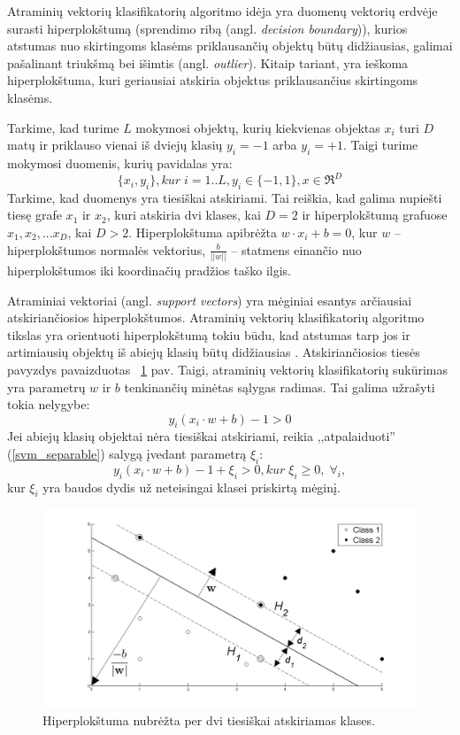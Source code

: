 Atraminių vektorių klasifikatorių algoritmo idėja yra duomenų vektorių erdvėje surasti hiperplokštumą (sprendimo ribą (angl. \textit{decision boundary})), kurios atstumas nuo skirtingoms klasėms priklausančių objektų būtų didžiausias, galimai pašalinant triukšmą bei išimtis (angl. \textit{outlier}). Kitaip tariant, yra ieškoma hiperplokštuma, kuri geriausiai atskiria objektus priklausančius skirtingoms klasėms. 

Tarkime, kad turime $L$ mokymosi objektų, kurių kiekvienas objektas $x_i$ turi $D$ matų ir priklauso vienai iš dviejų klasių $y_i=-1$ arba $y_i=+1$. Taigi turime mokymosi duomenis, kurių pavidalas yra:
\begin{equation}
 \{x_i, y_i\}, kur\; i=1..L, y_i \in \{-1,1\}, x \in \Re^D
\end{equation}
Tarkime, kad duomenys yra tiesiškai atskiriami. Tai reiškia, kad galima nupiešti tiesę grafe $x_1$ ir $x_2$, kuri atskiria dvi klases, kai $D=2$ ir hiperplokštumą grafuose $x_1, x_2,...x_D$, kai $D > 2$. Hiperplokštuma apibrėžta $w\cdot x_i + b = 0$, kur $w$ -- hiperplokštumos normalės vektorius, $\frac{b}{||w||}$ -- statmens einančio nuo hiperplokštumos iki koordinačių pradžios taško ilgis.

Atraminiai vektoriai (angl. \textit{support vectors}) yra mėginiai esantys arčiausiai atskiriančiosios hiperplokštumos. Atraminių vektorių klasifikatorių algoritmo tikslas yra orientuoti hiperplokštumą tokiu būdu, kad atstumas tarp jos ir artimiausių objektų iš abiejų klasių būtų didžiausias \cite{cortes1995support}. Atskiriančiosios tiesės pavyzdys pavaizduotas ~\ref{fig:support_vector_machines} pav. Taigi, atraminių vektorių klasifikatorių sukūrimas yra parametrų $w$ ir $b$ tenkinančių minėtas sąlygas radimas. Tai galima užrašyti tokia nelygybe:
\begin{equation}
 \label{svm_separable}
 y_i(x_i \cdot w + b) - 1 > 0
\end{equation}
Jei abiejų klasių objektai nėra tiesiškai atskiriami, reikia ,,atpalaiduoti'' (\ref{svm_separable}) salygą įvedant parametrą $\xi_i$:
\begin{equation}
 \label{svm_non_separable}
 y_i(x_i \cdot w + b) - 1 + \xi_i > 0, kur\; \xi_i \geq 0, \;  \forall_i,
\end{equation}
kur $\xi_i$ yra baudos dydis už neteisingai klasei priskirtą mėginį.
\begin{figure}
 \centering
 \includegraphics[width=.7\textwidth]{images/support_vector_machines.jpg}
 \caption{Hiperplokštuma nubrėžta per dvi tiesiškai atskiriamas klases.}
 \label{fig:support_vector_machines}
\end{figure}


